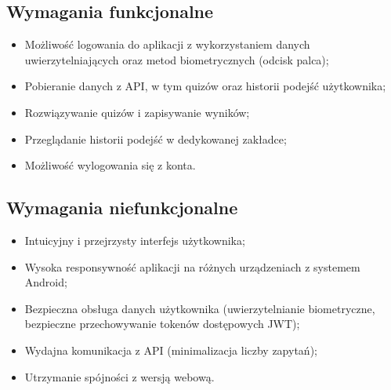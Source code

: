 \documentclass{article}
\begin{document}
	\subsection*{Wymagania funkcjonalne}
	\begin{itemize}
		\item Możliwość logowania do aplikacji z wykorzystaniem danych uwierzytelniających oraz metod biometrycznych (odcisk palca);
		\item Pobieranie danych z API, w tym quizów oraz historii podejść użytkownika;
		\item Rozwiązywanie quizów i zapisywanie wyników;
		\item Przeglądanie historii podejść w dedykowanej zakładce;
		\item Możliwość wylogowania się z konta.
	\end{itemize}
	
	\subsection*{Wymagania niefunkcjonalne}
	\begin{itemize}
		\item Intuicyjny i przejrzysty interfejs użytkownika;
		\item Wysoka responsywność aplikacji na różnych urządzeniach z systemem Android;
		\item Bezpieczna obsługa danych użytkownika (uwierzytelnianie biometryczne, bezpieczne przechowywanie tokenów dostępowych JWT);
		\item Wydajna komunikacja z API (minimalizacja liczby zapytań);
		\item Utrzymanie spójności z wersją webową.
	\end{itemize}
\end{document}
